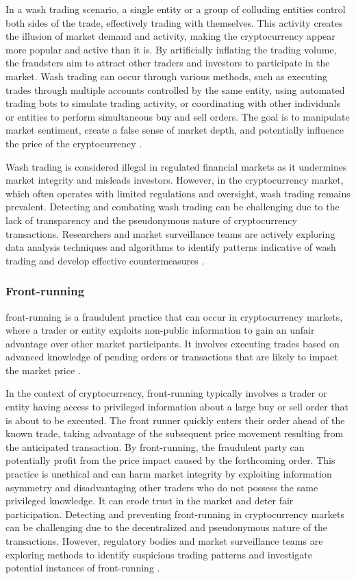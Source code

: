 In a wash trading scenario, a single entity or a group of colluding entities control both sides of the trade, effectively
trading with themselves. This activity creates the illusion of market demand and activity, making the cryptocurrency appear
more popular and active than it is. By artificially inflating the trading volume, the fraudsters aim to attract other traders
and investors to participate in the market. Wash trading can occur through various methods, such as executing trades through
multiple accounts controlled by the same entity, using automated trading bots to simulate trading activity, or coordinating
with other individuals or entities to perform simultaneous buy and sell orders. The goal is to manipulate market sentiment,
create a false sense of market depth, and potentially influence the price of the cryptocurrency \cite{edelman2018detecting}.

Wash trading is considered illegal in regulated financial markets as it undermines market integrity and misleads investors.
However, in the cryptocurrency market, which often operates with limited regulations and oversight, wash trading remains
prevalent. Detecting and combating wash trading can be challenging due to the lack of transparency and the pseudonymous
nature of cryptocurrency transactions. Researchers and market surveillance teams are actively exploring data analysis
techniques and algorithms to identify patterns indicative of wash trading and develop effective countermeasures
\cite{gandal2018price, edelman2018detecting}.

\subsubsection{Front-running}
front-running is a fraudulent practice that can occur in cryptocurrency markets, where a trader or entity exploits non-public
information to gain an unfair advantage over other market participants. It involves executing trades based on advanced
knowledge of pending orders or transactions that are likely to impact the market price \cite{van2021front}.

In the context of cryptocurrency, front-running typically involves a trader or entity having access to privileged information
about a large buy or sell order that is about to be executed. The front runner quickly enters their order ahead of the known
trade, taking advantage of the subsequent price movement resulting from the anticipated transaction. By front-running, the
fraudulent party can potentially profit from the price impact caused by the forthcoming order. This practice is unethical
and can harm market integrity by exploiting information asymmetry and disadvantaging other traders who do not possess the
same privileged knowledge. It can erode trust in the market and deter fair participation. Detecting and preventing
front-running in cryptocurrency markets can be challenging due to the decentralized and pseudonymous nature of the transactions.
However, regulatory bodies and market surveillance teams are exploring methods to identify suspicious trading patterns and
investigate potential instances of front-running \cite{bistarelli2018front}.

